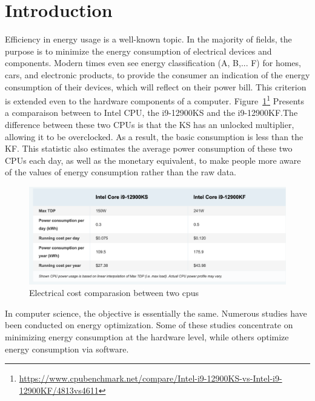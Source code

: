 

\section{Introduction}
Efficiency in energy usage is a well-known topic. In the majority of fields, the purpose is to minimize the energy consumption of electrical devices and components. Modern times even see energy classification (A, B,... F) for homes, cars, and electronic products, to provide the consumer an indication of the energy consumption of their devices, which will reflect on their power bill. This criterion is extended even to the hardware components of a computer.
Figure~\ref{fig:soa_comparaisoncpu}\footnote{\url{https://www.cpubenchmark.net/compare/Intel-i9-12900KS-vs-Intel-i9-12900KF/4813vs4611}} Presents a comparaison between to Intel CPU, the i9-12900KS and the i9-12900KF.The difference between these two CPUs is that the KS has an unlocked multiplier, allowing it to be overclocked. As a result, the basic consumption is less than the KF. This statistic also estimates the average power consumption of these two CPUs each day, as well as the monetary equivalent, to make people more aware of the values of energy consumption rather than the raw data.


\begin{figure}
    \includegraphics[width=\linewidth]{imgs/cpu_cost_comparaison}
    \caption{Electrical cost comparasion between two cpus }
    \label{fig:soa_comparaisoncpu}
\end{figure}

In computer science, the objective is essentially the same. Numerous studies have been conducted on energy optimization. Some of these studies concentrate on minimizing energy consumption at the hardware level, while others optimize energy consumption via software.



